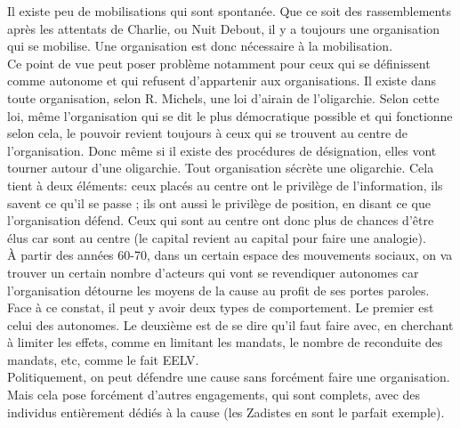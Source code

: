 \documentclass[10pt, a4paper, openany]{book}
\begin{document}
Il existe peu de mobilisations qui sont spontanée. Que ce soit des rassemblements après les attentats de Charlie, ou Nuit Debout, il y a toujours une organisation qui se mobilise. Une organisation est donc nécessaire à la mobilisation. \\
Ce point de vue peut poser problème notamment pour ceux qui se définissent comme autonome et qui refusent d'appartenir aux organisations. Il existe dans toute organisation, selon R. Michels, une loi d'airain de l'oligarchie. Selon cette loi, même l'organisation qui se dit le plus démocratique possible et qui fonctionne selon cela, le pouvoir revient toujours à ceux qui se trouvent au centre de l'organisation. Donc même si il existe des procédures de désignation, elles vont tourner autour d'une oligarchie. Tout organisation sécrète une oligarchie. Cela tient à deux éléments: ceux placés au centre ont le privilège de l'information, ils savent ce qu'il se passe ; ils ont aussi le privilège de position, en disant ce que l'organisation défend. Ceux qui sont au centre ont donc plus de chances d'être élus car sont au centre (le capital revient au capital pour faire une analogie). \\
À partir des années 60-70, dans un certain espace des mouvements sociaux, on va trouver un certain nombre d'acteurs qui vont se revendiquer autonomes car l'organisation détourne les moyens de la cause au profit de ses portes paroles. Face à ce constat, il peut y avoir deux types de comportement. Le premier est celui des autonomes. Le deuxième est de se dire qu'il faut faire avec, en cherchant à limiter les effets, comme en limitant les mandats, le nombre de reconduite des mandats, etc, comme le fait EELV. \\
Politiquement, on peut défendre une cause sans forcément faire une organisation. Mais cela pose forcément d'autres engagements, qui sont complets, avec des individus entièrement dédiés à la cause (les Zadistes en sont le parfait exemple). 
\end{document}

